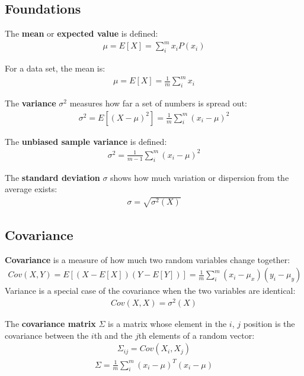 \documentclass{report}
\begin{document}
\subsection{Foundations}
The {\bf mean} or {\bf expected value} is defined:
\begin{align*}
\mu = E[X] = \sum_i^m x_iP(x_i)
\end{align*}

For a data set, the mean is:
\begin{align*}
\mu = E[X] = \frac{1}{m}\sum_i^m x_i
\end{align*}

The {\bf variance} $\sigma^2$ measures how far a set of numbers is spread out:
\begin{align*}
\sigma^2 = E[(X-\mu)^2] = \frac{1}{m}\sum_i^m (x_i-\mu)^2
\end{align*}

The {\bf unbiased sample variance} is defined:
\begin{align*}
\sigma^2 = \frac{1}{m-1}\sum_i^m (x_i-\mu)^2
\end{align*}

The {\bf standard deviation} $\sigma$ shows how much variation or dispersion from the average exists:
\begin{align*}
\sigma = \sqrt{\sigma^2(X)}
\end{align*}

\subsection{Covariance}
{\bf Covariance} is a measure of how much two random variables change together:
\begin{align*}
Cov(X,Y) = E[(X-E[X])(Y-E[Y])] = \frac{1}{m}\sum_i^m (x_i-\mu_x)(y_i-\mu_y)
\end{align*}
Variance is a special case of the covariance when the two variables are identical:
\begin{align*}
Cov(X,X) = \sigma^2(X)
\end{align*}

The {\bf covariance matrix} $\Sigma$ is a matrix whose element in the $i$, $j$ position is the covariance between the $i$th and the $j$th elements of a random vector:
\begin{align*}
\Sigma_{ij} = Cov(X_i, X_j)
\end{align*}
\begin{align*}
\Sigma = \frac{1}{m}\sum_i^m (x_i-\mu)^T(x_i-\mu)
\end{align*}
\end{document}
